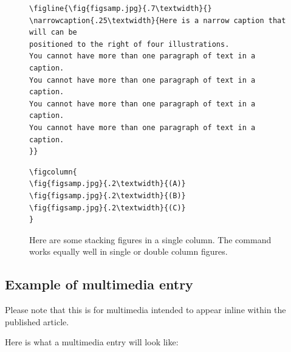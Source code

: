 \documentclass[reprint]{JASAnew}
\begin{document}
\begin{figure}
\baselineskip=12pt
\begin{verbatim}
\figline{\fig{figsamp.jpg}{.7\textwidth}{}
\narrowcaption{.25\textwidth}{Here is a narrow caption that will can be
positioned to the right of four illustrations.
You cannot have more than one paragraph of text in a caption.
You cannot have more than one paragraph of text in a caption.
You cannot have more than one paragraph of text in a caption.
You cannot have more than one paragraph of text in a caption.
}}
\end{verbatim}
\end{figure}
\clearpage

\begin{figure}[h]
\baselineskip=12pt
\begin{verbatim}
\figcolumn{
\fig{figsamp.jpg}{.2\textwidth}{(A)}
\fig{figsamp.jpg}{.2\textwidth}{(B)}
\fig{figsamp.jpg}{.2\textwidth}{(C)}
}
\end{verbatim}


\caption{Here are some stacking figures in a single column. 
The {\tt\string\figcolumn\string{\string}} command works equally well in single
or double column figures.}
\end{figure}

\vskip-24pt
\vskip1sp
\subsection{Example of multimedia entry}
Please note that this is for multimedia intended to appear inline
within the published article. 

Here is what a multimedia entry will look like:
\label{mmtest1}
\end{document}

